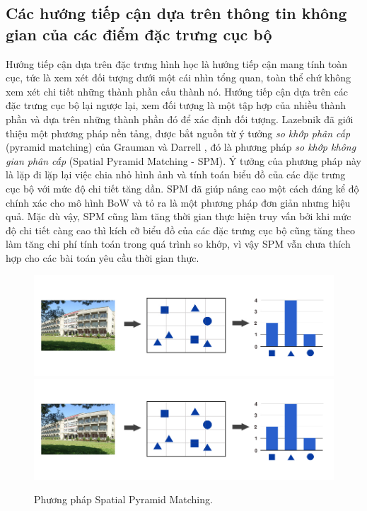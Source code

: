 \subsection{Các hướng tiếp cận dựa trên thông tin không gian của các điểm đặc trưng cục bộ}
\label{spm}

Hướng tiếp cận dựa trên đặc trưng hình học là hướng tiếp cận mang tính toàn cục, tức là xem xét đối tượng dưới một cái nhìn tổng quan, toàn thể chứ không xem xét chi tiết những thành phần cấu thành nó. Hướng tiếp cận dựa trên các đặc trưng cục bộ lại ngược lại, xem đối tượng là một tập hợp của nhiều thành phần và dựa trên những thành phần đó để xác định đối tượng. Lazebnik \cite{lazebnik2006beyond} đã giới thiệu một phương pháp nền tảng, được bắt nguồn từ ý tưởng \textit{so khớp phân cấp} (pyramid matching) của Grauman và Darrell \cite{grauman2005pyramid}, đó là phương pháp \textit{so khớp không gian phân cấp} (Spatial Pyramid Matching - SPM). Ý tưởng của phương pháp này là lặp đi lặp lại việc chia nhỏ hình ảnh và tính toán biểu đồ của các đặc trưng cục bộ với mức độ chi tiết tăng dần. SPM đã giúp nâng cao một cách đáng kể độ chính xác cho mô hình BoW và tỏ ra là một phương pháp đơn giản nhưng hiệu quả. Mặc dù vậy, SPM cũng làm tăng thời gian thực hiện truy vấn bởi khi mức độ chi tiết càng cao thì kích cỡ biểu đồ của các đặc trưng cục bộ cũng tăng theo làm tăng chi phí tính toán trong quá trình so khớp, vì vậy SPM vẫn chưa thích hợp cho các bài toán yêu cầu thời gian thực.

\begin{figure}[!htbp]
  \begin{center}
    \leavevmode
    \ifpdf
      \includegraphics[scale=0.32]{bow-preview}
    \else
      \includegraphics[scale=0.32]{bow-preview}
    \fi
    \caption[Phương pháp Spatial Pyramid Matching]{Phương pháp Spatial Pyramid Matching.}
    \label{FigSPM}
  \end{center}
\end{figure}


